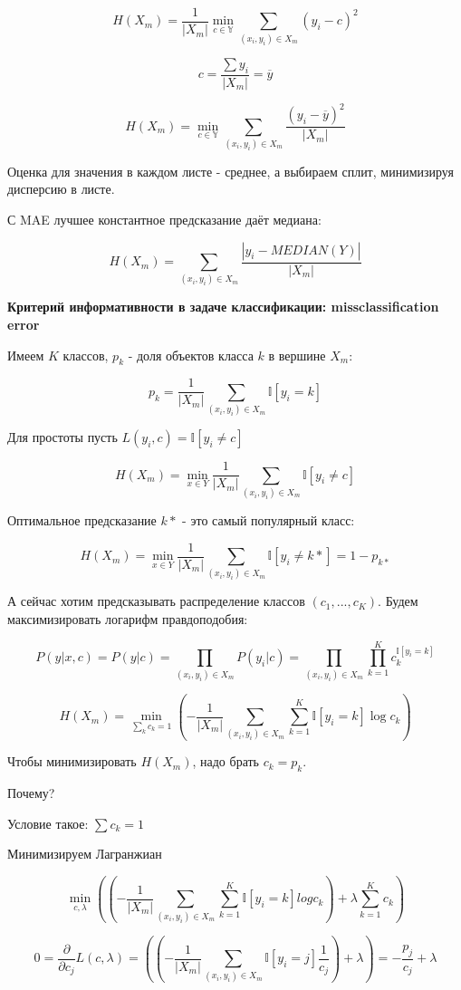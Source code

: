 \documentclass[12pt]{article}
\begin{document}
\begin{itemize}
\[ H(X_m) = \frac{1}{|X_m|} \min_{c \in \mathbb{Y}} \sum_{(x_i, y_i) \in X_m} (y_i - c)^2 \]

\[ c = \frac{\sum y_i}{|X_m|} = \overline{y} \]

\[ H(X_m) =  \min_{c \in \mathbb{Y}} \sum_{(x_i, y_i) \in X_m} \frac{(y_i - \overline{y})^2}{|X_m|} \]


Оценка для значения в каждом листе - среднее, а выбираем сплит, минимизируя дисперсию в листе.

С MAE лучшее константное предсказание даёт медиана:

\[ H(X_m) = \sum_{(x_i, y_i) \in X_m} \frac{|y_i - MEDIAN(Y)|}{|X_m|} \]

\textbf{Критерий информативности в задаче классификации: missclassification error}

Имеем $K$ классов, $p_k$ - доля объектов класса $k$ в вершине $X_m$:

\[ p_k = \frac{1}{|X_m|} \sum_{(x_i, y_i) \in X_m} \mathbb{I}[y_i = k] \]

Для простоты пусть $L(y_i, c) = \mathbb{I}[y_i \neq c] $

\[ H(X_m) = \min_{x \in Y} \frac{1}{|X_m|}  \sum_{(x_i, y_i) \in X_m} \mathbb{I} [y_i \neq c ] \]

Оптимальное предсказание $k*$ - это самый популярный класс:

\[ H(X_m) = \min_{x \in Y} \frac{1}{|X_m|}  \sum_{(x_i, y_i) \in X_m} \mathbb{I} [y_i \neq k* ] = 1 - p_{k*}\]

А сейчас хотим предсказывать распределение классов $(c_1, ..., c_K)$. Будем максимизировать логарифм правдоподобия:

\[ P(y|x, c) = P(y|c) = \prod_{(x_i, y_i) \in X_m} P(y_i|c) = \prod_{(x_i, y_i) \in X_m} \prod_{k=1}^K c_k^{\mathbb{I}[y_i=k]}\]

\[ H(X_m) = \min_{\sum_k c_k = 1} \left( -\frac{1}{|X_m|} \sum_{(x_i, y_i) \in X_m} \sum_{k=1}^K \mathbb{I} [y_i = k] \log c_k \right)\]

Чтобы минимизировать $H(X_m)$, надо брать $c_k = p_k$.

Почему?

Условие такое: $\sum c_k = 1$

Минимизируем Лагранжиан 

\[ \min_{c, \lambda} \left( \left( -\frac{1}{|X_m|} \sum_{(x_i, y_i) \in X_m} \sum_{k=1}^K \mathbb{I} [y_i = k] log c_k \right) + \lambda \sum_{k=1}^K c_k \right) \]

\[ 0 = \frac{\partial }{\partial c_j} L(c, \lambda) = \left( \left( -\frac{1}{|X_m|} \sum_{(x_i, y_i) \in X_m} \mathbb{I} [y_i = j] \frac{1}{c_j} \right) + \lambda  \right) = -\frac{p_j}{c_j} + \lambda \]


\end{itemize}
\end{document}
